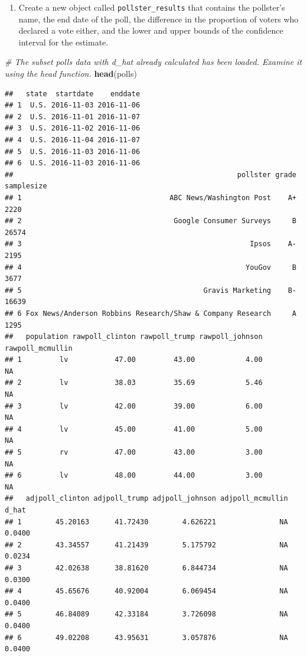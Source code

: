 \documentclass[
]{article}
\newenvironment{Shaded}{\begin{snugshade}}{\end{snugshade}}
\newcommand{\CommentTok}[1]{\textcolor[rgb]{0.56,0.35,0.01}{\textit{#1}}}
\newcommand{\KeywordTok}[1]{\textcolor[rgb]{0.13,0.29,0.53}{\textbf{#1}}}
\newcommand{\NormalTok}[1]{#1}
\providecommand{\tightlist}{%
  \setlength{\itemsep}{0pt}\setlength{\parskip}{0pt}}
\begin{document}
\begin{enumerate}
\def\labelenumi{\arabic{enumi}.}
\setcounter{enumi}{5}
\tightlist
\item
  Create a new object called \texttt{pollster\_results} that contains
  the pollster's name, the end date of the poll, the difference in the
  proportion of voters who declared a vote either, and the lower and
  upper bounds of the confidence interval for the estimate.
\end{enumerate}

\begin{Shaded}
\begin{Highlighting}[]
\CommentTok{\# The subset \textasciigrave{}polls\textasciigrave{} data with \textquotesingle{}d\_hat\textquotesingle{} already calculated has been loaded. Examine it using the \textasciigrave{}head\textasciigrave{} function.}
\KeywordTok{head}\NormalTok{(polls)}
\end{Highlighting}
\end{Shaded}

\begin{verbatim}
##   state  startdate    enddate
## 1  U.S. 2016-11-03 2016-11-06
## 2  U.S. 2016-11-01 2016-11-07
## 3  U.S. 2016-11-02 2016-11-06
## 4  U.S. 2016-11-04 2016-11-07
## 5  U.S. 2016-11-03 2016-11-06
## 6  U.S. 2016-11-03 2016-11-06
##                                                     pollster grade samplesize
## 1                                   ABC News/Washington Post    A+       2220
## 2                                    Google Consumer Surveys     B      26574
## 3                                                      Ipsos    A-       2195
## 4                                                     YouGov     B       3677
## 5                                           Gravis Marketing    B-      16639
## 6 Fox News/Anderson Robbins Research/Shaw & Company Research     A       1295
##   population rawpoll_clinton rawpoll_trump rawpoll_johnson rawpoll_mcmullin
## 1         lv           47.00         43.00            4.00               NA
## 2         lv           38.03         35.69            5.46               NA
## 3         lv           42.00         39.00            6.00               NA
## 4         lv           45.00         41.00            5.00               NA
## 5         rv           47.00         43.00            3.00               NA
## 6         lv           48.00         44.00            3.00               NA
##   adjpoll_clinton adjpoll_trump adjpoll_johnson adjpoll_mcmullin  d_hat
## 1        45.20163      41.72430        4.626221               NA 0.0400
## 2        43.34557      41.21439        5.175792               NA 0.0234
## 3        42.02638      38.81620        6.844734               NA 0.0300
## 4        45.65676      40.92004        6.069454               NA 0.0400
## 5        46.84089      42.33184        3.726098               NA 0.0400
## 6        49.02208      43.95631        3.057876               NA 0.0400
\end{verbatim}
\end{document}
